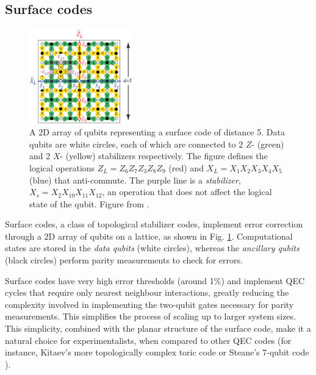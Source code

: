 \subsection{Surface codes}
\begin{figure}
  \centering
  \includegraphics[width=0.4\textwidth]{images/surface_code.png}
  \caption{A 2D array of qubits representing a surface code of distance 5. Data
    qubits are white circles, each of which are connected to 2 $Z$- (green)
    and 2 $X$- (yellow) stabilizers respectively. The figure defines the logical
    operations $Z_L = Z_6Z_7Z_3Z_8Z_9$ (red) and $X_L = X_1X_2X_3X_4X_5$ (blue)
    that anti-commute. The purple line is a \textit{stabilizer},
    $X_s = X_2 X_{10}X_{11} X_{12} $, an operation that does not affect the
    logical state of the qubit. Figure from \cite{fowler12_surfac_codes}.}
  \label{fig:surface_code}
\end{figure}

Surface codes, a class of topological stabilizer codes, implement error
correction through a 2D array of qubits on a lattice, as shown in Fig.
\ref{fig:surface_code}. Computational states are stored in the \textit{data
  qubits} (white circles), whereas the \textit{ancillary qubits} (black circles)
perform parity measurements to check for errors. 

Surface codes have very high error thresholds (around 1\%) \cite{terhal15} and
implement QEC cycles that require only nearest neighbour interactions, greatly
reducing the complexity involved in implementing the two-qubit gates necessary
for parity measurements. This simplifies the process of scaling up to larger
system sizes. This simplicity, combined with the planar structure of the surface
code, make it a natural choice for experimentalists, when compared to other QEC
codes (for instance, Kitaev's more topologically complex toric code
\cite{Kitaev_2003} or Steane's 7-qubit code \cite{Steane_1996_QEC}).


